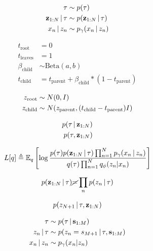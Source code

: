 \begin{align*}
    \tau &\sim p(\tau) \\
    \mathbf{z}_{1:N} \,|\, \tau &\sim p(\mathbf{z}_{1:N} \,|\, \tau) \\
    x_n \,|\, z_n &\sim p_\gamma(x_n \,|\, z_n)
\end{align*}

\begin{align*}
    t_{\textrm{root}} &= 0 \\
    t_{\textrm{leaves}} &= 1 \\
    \beta_{\textrm{child}} &\sim \textrm{Beta}(a, b)\\
    t_{\textrm{child}} &= t_{\textrm{parent}} + \beta_{\textrm{child}} * (1 - t_{\textrm{parent}})
\end{align*}

\begin{align*}
    z_{\textrm{root}} &\sim N(0, I) \\
    z_{\textrm{child}} &\sim N(z_{\textrm{parent}}, (t_{\textrm{child}} - t_{\textrm{parent}}) I)
\end{align*}

\begin{align*}
    p(\tau \,|\, \mathbf{z}_{1:N}) \\
    p(\tau, \mathbf{z}_{1:N})
\end{align*}

\begin{align*}
  L[q] \triangleq \mathbb{E}_q\left[\log \frac{p(\tau)p(\mathbf{z}_{1:N} \,|\, \tau)\prod_{n = 1}^N p_\gamma(x_n \,|\, z_n)}
  {q(\tau)\prod_{n = 1}^N q_\phi(z_n | x_n)}\right]
\end{align*}

\begin{align*}
  p(\mathbf{z}_{1:N} \,|\, \tau) \cancel{=} \prod_n p(z_n \,|\, \tau)
\end{align*}

\begin{align*}
    p(z_{N + 1} \,|\, \tau, \mathbf{z}_{1:N})
\end{align*}

\begin{align*}
  \tau &\sim p(\tau \,|\, \textbf{s}_{1:M}) \\
  z_n \,|\, \tau &\sim p(z_n = s_{M + 1} \,|\, \tau, \textbf{s}_{1:M}) \\
  x_n \,|\, z_n &\sim p_\gamma(x_n | z_n)
\end{align*}
\fi